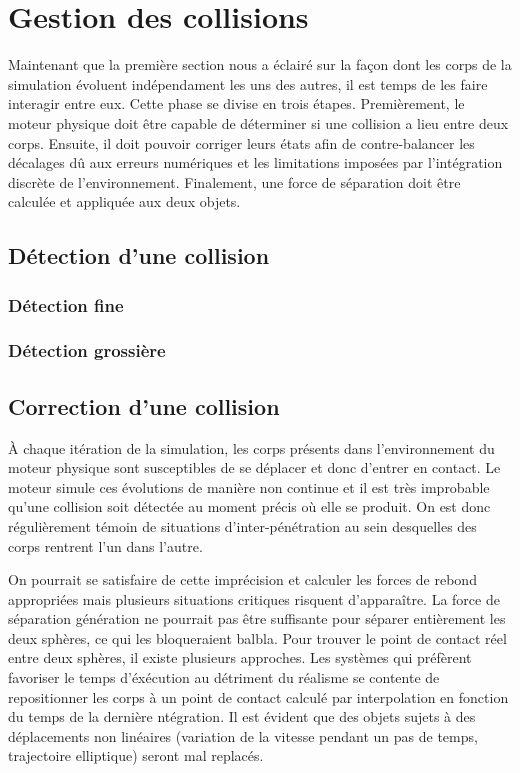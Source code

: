 \section{Gestion des collisions}

Maintenant que la première section nous a éclairé sur la façon dont les corps de la simulation évoluent indépendament les uns des autres, il est temps de les faire interagir entre eux. Cette phase se divise en trois étapes. Premièrement, le moteur physique doit être capable de déterminer si une collision a lieu entre deux corps. Ensuite, il doit pouvoir corriger leurs états afin de contre-balancer les décalages dû aux erreurs numériques et les limitations imposées par l'intégration discrète de l'environnement. Finalement, une force de séparation doit être calculée et appliquée aux deux objets.

\subsection{Détection d'une collision}

\subsubsection{Détection fine}



\subsubsection{Détection grossière}


\subsection{Correction d'une collision}

\`A chaque itération de la simulation, les corps présents dans l'environnement du moteur physique sont susceptibles de se déplacer et donc d'entrer en contact. Le moteur simule ces évolutions de manière non continue et il est très improbable qu'une collision soit détectée au moment précis o\`u elle se produit. On est donc régulièrement témoin de situations d'inter-pénétration au sein desquelles des corps rentrent l'un dans l'autre.

On pourrait se satisfaire de cette imprécision et calculer les forces de rebond appropriées mais plusieurs situations critiques risquent d'apparaître. La force de séparation génération ne pourrait pas être suffisante pour séparer entièrement les deux sphères, ce qui les bloqueraient balbla. Pour trouver le point de contact réel entre deux sphères, il existe plusieurs approches. Les systèmes qui préfèrent favoriser le temps d'éxécution au détriment du réalisme se contente de repositionner les corps à un point de contact calculé par interpolation en fonction du temps de la dernière ntégration. Il est évident que des objets sujets à des déplacements non linéaires (variation de la vitesse pendant un pas de temps, trajectoire elliptique) seront mal replacés.

